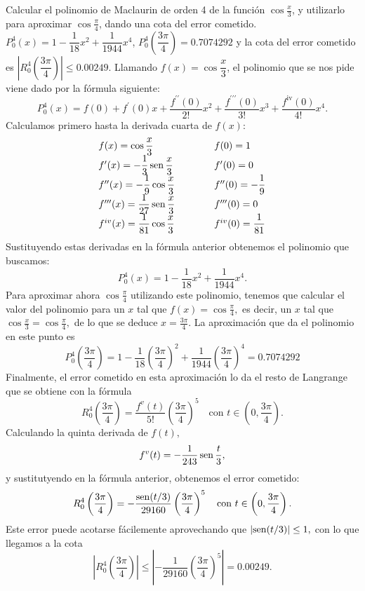{Calcular el polinomio de Maclaurin de orden 4 de la función $\cos\frac{x}{3}$, y utilizarlo para aproximar $\cos\frac{\pi}{4}$, dando una
cota del error cometido.
}
{$P_0^4(x)=1-\dfrac{1}{18}x^2+\dfrac{1}{1944}x^4$, $P_0^4\left(\dfrac{3\pi }{4}\right) = 0.7074292$ y la cota del error cometido es $\left|R_0^4\left(\dfrac{3\pi}{4}\right)\right| \leq 0.00249.$
}
{Llamando $f(x)=\cos\dfrac{x}{3}$, el polinomio que se nos pide viene dado por la fórmula siguiente:
\[
P_0^4(x)=f(0)+f^{\prime }(0)x+\frac{f^{\prime \prime }(0)}{2!}x^2+\frac{f^{\prime \prime \prime }(0)}{3!}x^3+\frac{f^{\text{iv}}(0)}{4!}x^4.
\]
Calculamos primero hasta la derivada cuarta de $f(x)$:
\[
\begin{array}{lll}
f(x)=\cos\dfrac{x}{3} & \qquad & f(0)=1 \\
f^{\prime }(x)=-\dfrac{1}{3}\operatorname{sen}\dfrac{x}{3} & &  f^{\prime }(0)=0 \\
f^{\prime \prime }(x)=-\dfrac{1}{9}\cos\dfrac{x}{3} &  & f^{\prime \prime }(0)=-\dfrac{1}{9}\\
f^{\prime \prime \prime}(x)=\dfrac{1}{27}\operatorname{sen}\dfrac{x}{3} & &  f^{\prime \prime \prime }(0)=0 \\
f^{iv}(x)=\dfrac{1}{81}\cos\dfrac{x}{3} & & f^{iv}(0)=\dfrac{1}{81}
\end{array}
\]
Sustituyendo estas derivadas en la fórmula anterior obtenemos el polinomio que buscamos:
\[
P_0^4(x)=1-\dfrac{1}{18}x^2+\frac{1}{1944}x^4.
\]
Para aproximar ahora $\cos\frac{\pi}{4}$ utilizando este polinomio, tenemos que calcular el valor del polinomio para un $x$ tal que $f(x)=\cos\frac{\pi}{4},$ es decir, un $x$ tal que $\cos\frac{x}{3}=\cos\frac{\pi}{4},$ de lo que se deduce $x=\frac{3\pi}{4}$. La aproximación que da el polinomio en este punto es
\[
P_0^4\left(\dfrac{3\pi }{4}\right)=1-\dfrac{1}{18}\left(\dfrac{3\pi}{4}\right)^2+\frac{1}{1944}\left(\dfrac{3\pi}{4}\right)^4=0.7074292
\]
Finalmente, el error cometido en esta aproximación lo da el resto de Langrange que se obtiene con la fórmula
\[
R_0^4\left(\dfrac{3\pi}{4}\right)=\frac{f^{v}(t)}{5!}\left(\dfrac{3\pi}{4}\right)^5\quad \text{con }t\in \left(0,\frac{3\pi}{4}\right).
\]
Calculando la quinta derivada de $f(t),$
\[
f^{v}(t)=-\dfrac{1}{243}\operatorname{sen}\dfrac{t}{3},
\]
y sustitutyendo en la fórmula anterior, obtenemos el error cometido:
\[
R_0^4\left(\dfrac{3\pi}{4}\right)=-\dfrac{\operatorname{sen}(t/3)}{29160}\left(\dfrac{3\pi}{4}\right)^5\quad \text{con }t\in \left(0,\frac{3\pi}{4}\right).
\]
Este error puede acotarse fácilemente aprovechando que $\left|\operatorname{sen}(t/3)\right| \leq 1,$ con lo que llegamos a la cota
\[
\left|R_0^4\left(\dfrac{3\pi}{4}\right)\right| \leq \left|-\dfrac{1}{29160}\left(\dfrac{3\pi}{4}\right)^5\right| = 0.00249.
\]
}



